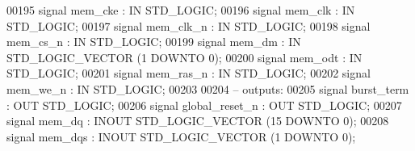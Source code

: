 \begin{DoxyCode}
00195                  \textcolor{keywordflow}{signal} \textcolor{vhdlchar}{mem_cke} \textcolor{vhdlchar}{:} \textcolor{keywordflow}{IN} \textcolor{comment}{STD\_LOGIC};
00196                  \textcolor{keywordflow}{signal} \textcolor{vhdlchar}{mem_clk} \textcolor{vhdlchar}{:} \textcolor{keywordflow}{IN} \textcolor{comment}{STD\_LOGIC};
00197                  \textcolor{keywordflow}{signal} \textcolor{vhdlchar}{mem_clk_n} \textcolor{vhdlchar}{:} \textcolor{keywordflow}{IN} \textcolor{comment}{STD\_LOGIC};
00198                  \textcolor{keywordflow}{signal} \textcolor{vhdlchar}{mem_cs_n} \textcolor{vhdlchar}{:} \textcolor{keywordflow}{IN} \textcolor{comment}{STD\_LOGIC};
00199                  \textcolor{keywordflow}{signal} \textcolor{vhdlchar}{mem_dm} \textcolor{vhdlchar}{:} \textcolor{keywordflow}{IN} \textcolor{comment}{STD\_LOGIC\_VECTOR} \textcolor{vhdlchar}{(}\textcolor{vhdllogic}{}\textcolor{vhdllogic}{1} \textcolor{keywordflow}{DOWNTO} \textcolor{vhdllogic}{}\textcolor{vhdllogic}{0}\textcolor{vhdlchar}{)};
00200                  \textcolor{keywordflow}{signal} \textcolor{vhdlchar}{mem_odt} \textcolor{vhdlchar}{:} \textcolor{keywordflow}{IN} \textcolor{comment}{STD\_LOGIC};
00201                  \textcolor{keywordflow}{signal} \textcolor{vhdlchar}{mem_ras_n} \textcolor{vhdlchar}{:} \textcolor{keywordflow}{IN} \textcolor{comment}{STD\_LOGIC};
00202                  \textcolor{keywordflow}{signal} \textcolor{vhdlchar}{mem_we_n} \textcolor{vhdlchar}{:} \textcolor{keywordflow}{IN} \textcolor{comment}{STD\_LOGIC};
00203 
00204 \textcolor{keyword}{              -- outputs:}
00205                  \textcolor{keywordflow}{signal} \textcolor{vhdlchar}{burst_term} \textcolor{vhdlchar}{:} \textcolor{keywordflow}{OUT} \textcolor{comment}{STD\_LOGIC};
00206                  \textcolor{keywordflow}{signal} \textcolor{vhdlchar}{global_reset_n} \textcolor{vhdlchar}{:} \textcolor{keywordflow}{OUT} \textcolor{comment}{STD\_LOGIC};
00207                  \textcolor{keywordflow}{signal} \textcolor{vhdlchar}{mem_dq} \textcolor{vhdlchar}{:} \textcolor{keywordflow}{INOUT} \textcolor{comment}{STD\_LOGIC\_VECTOR} \textcolor{vhdlchar}{(}\textcolor{vhdllogic}{}\textcolor{vhdllogic}{15} \textcolor{keywordflow}{DOWNTO} \textcolor{vhdllogic}{}\textcolor{vhdllogic}{0}\textcolor{vhdlchar}{)};
00208                  \textcolor{keywordflow}{signal} \textcolor{vhdlchar}{mem_dqs} \textcolor{vhdlchar}{:} \textcolor{keywordflow}{INOUT} \textcolor{comment}{STD\_LOGIC\_VECTOR} \textcolor{vhdlchar}{(}\textcolor{vhdllogic}{}\textcolor{vhdllogic}{1} \textcolor{keywordflow}{DOWNTO} \textcolor{vhdllogic}{}\textcolor{vhdllogic}{0}\textcolor{vhdlchar}{)};

\end{DoxyCode}
